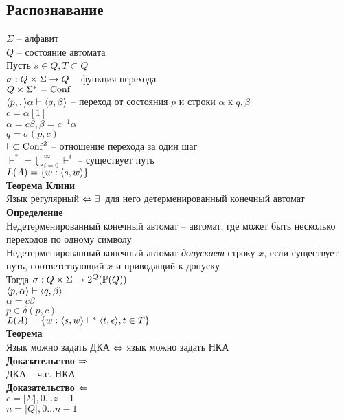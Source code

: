 \documentclass[12pt]{article}
\begin{document}
\subsection{Распознавание}
$\Sigma$ -- алфавит\\
$Q$ -- состояние автомата\\
Пусть $s \in Q, T \subset Q$\\
$\sigma: Q \times \Sigma \rightarrow Q$ -- функция перехода\\
$Q \times \Sigma^*=\operatorname{Conf}$\\
$\langle p, , \rangle \alpha \vdash \langle q, \beta \rangle$ -- переход от состояния $p$ и строки $\alpha$ к $q, \beta$\\
$c=\alpha[1]$\\
$\alpha = c\beta, \beta = c^{-1}\alpha$\\
$q = \sigma(p, c)$\\
$\vdash \subset \operatorname{Conf}^2$ -- отношение перехода за один шаг\\
$\vdash^* = \bigcup_{i=0}^\infty \vdash^i$ -- существует путь\\
$L(A) = \{ w: \langle s, w \rangle \}$\\
\textbf{Теорема Клини}\\
Язык регулярный $\Leftrightarrow \exists\,$ для него детерменированный конечный автомат\\
\textbf{Определение}\\
Недетерменированный конечный автомат -- автомат, где может быть несколько переходов по одному символу\\
Недетерменированный конечный автомат \textit{допускает} строку $x$, если существует путь, соответствующий $x$ и приводящий к допуску\\
Тогда $\sigma: Q \times \Sigma \rightarrow 2^Q (\mathbb{P}(Q))$\\
$\langle p, \alpha \rangle \vdash \langle q, \beta \rangle$\\
$\alpha = c\beta$\\
$p \in \delta(p, c)$\\
$L(A) = \{ w: \langle s, w \rangle \vdash^* \langle t, \epsilon \rangle, t \in T \}$\\
\textbf{Теорема}\\
Язык можно задать ДКА $\Leftrightarrow$ язык можно задать НКА\\
\textbf{Доказательство $\Rightarrow$}\\
ДКА -- ч.с. НКА\\
\textbf{Доказательство $\Leftarrow$}\\
$c=|\Sigma|, 0\ldots z-1$\\
$n=|Q|, 0\ldots n-1$\\
\end{document}

